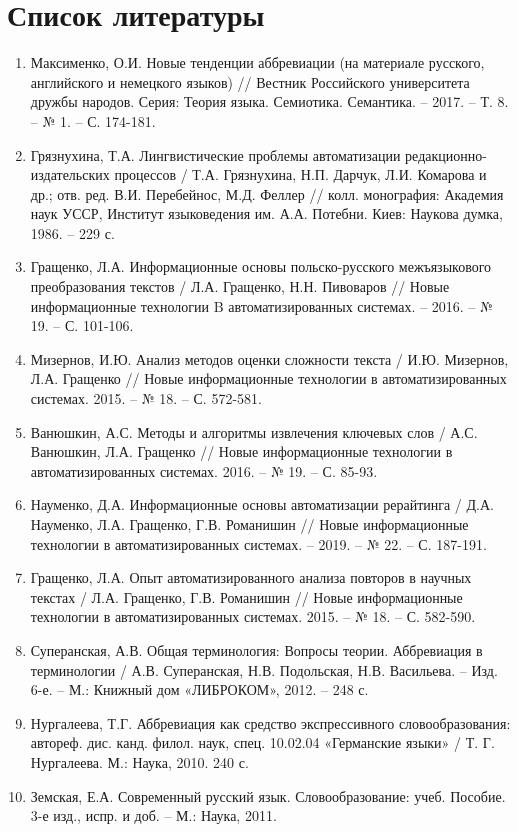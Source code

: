 \documentclass{article}
\begin{document}
\section*{Список литературы}
\begin{enumerate}
    \item Максименко, О.И. Новые тенденции аббревиации (на материале русского, английского и немецкого языков) // Вестник Российского университета дружбы народов. Серия: Теория языка. Семиотика. Семантика. – 2017. – Т. 8. – № 1. – С. 174-181.
    \item Грязнухина, Т.А. Лингвистические проблемы автоматизации редакционно-издательских процессов / Т.А. Грязнухина, Н.П. Дарчук, Л.И. Комарова и др.; отв. ред. В.И. Перебейнос, М.Д. Феллер // колл. монография: Академия наук УССР, Институт языковедения им. А.А. Потебни. Киев: Наукова думка, 1986. – 229 с.
    \item Гращенко, Л.А. Информационные основы польско-русского межъязыкового преобразования текстов / Л.А. Гращенко, Н.Н. Пивоваров // Новые информационные технологии B автоматизированных системах. – 2016. – № 19. – С. 101-106.
    \item Мизернов, И.Ю. Анализ методов оценки сложности текста / И.Ю. Мизернов, Л.А. Гращенко // Новые информационные технологии в автоматизированных системах. 2015. – № 18. – С. 572-581.
    \item Ванюшкин, А.С. Методы и алгоритмы извлечения ключевых слов / А.С. Ванюшкин, Л.А. Гращенко // Новые информационные технологии в автоматизированных системах. 2016. – № 19. – С. 85-93.
    \item Науменко, Д.А. Информационные основы автоматизации рерайтинга / Д.А. Науменко, Л.А. Гращенко, Г.В. Романишин // Новые информационные технологии в автоматизированных системах. – 2019. – № 22. – С. 187-191.
    \item Гращенко, Л.А. Опыт автоматизированного анализа повторов в научных текстах / Л.А. Гращенко, Г.В. Романишин // Новые информационные технологии в автоматизированных системах. 2015. – № 18. – С. 582-590.
    \item Суперанская, А.В. Общая терминология: Вопросы теории. Аббревиация в терминологии / А.В. Суперанская, Н.В. Подольская, Н.В. Васильева. – Изд. 6-е. – М.: Книжный дом «ЛИБРОКОМ», 2012. – 248 с.
    \item Нургалеева, Т.Г. Аббревиация как средство экспрессивного словообразования: автореф. дис. канд. филол. наук, спец. 10.02.04 «Германские языки» / Т. Г. Нургалеева. М.: Наука, 2010. 240 с.
    \item Земская, Е.А. Современный русский язык. Словообразование: учеб. Пособие. 3-е изд., испр. и доб. – М.: Наука, 2011.

\end{enumerate}
\end{document}
